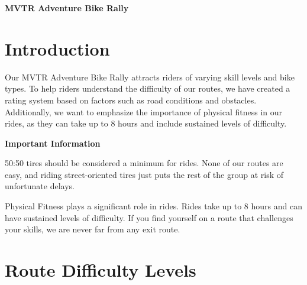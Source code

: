 \documentclass{article}
\begin{document}
\begin{center}
    {\fontsize{28}{36}\selectfont\bfseries MVTR Adventure Bike Rally}
\end{center}

\section*{Introduction}

Our MVTR Adventure Bike Rally attracts riders of varying skill levels and bike types. To help riders understand the difficulty of our routes, we have created a rating system based on factors such as road conditions and obstacles. Additionally, we want to emphasize the importance of physical fitness in our rides, as they can take up to 8 hours and include sustained levels of difficulty.

\noindent
\begin{minipage}[t]{0.45\linewidth}
    \textbf{Important Information}
    
    \vspace{0.5em}
    
    50:50 tires should be considered a minimum for rides. None of our routes are easy, and riding street-oriented tires just puts the rest of the group at risk of unfortunate delays.
    
    \vspace{1.5em}
    
    \noindent Physical Fitness plays a significant role in rides. Rides take up to 8 hours and can have sustained levels of difficulty. If you find yourself on a route that challenges your skills, we are never far from any exit route.
\end{minipage}
\hfill

\section*{Route Difficulty Levels}
\end{document}
